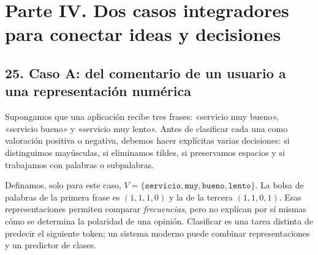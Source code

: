\chapter*{Parte IV. Dos casos integradores para conectar ideas y decisiones}
\section*{25. Caso A: del comentario de un usuario a una representación numérica}
Supongamos que una aplicación recibe tres frases: «servicio muy bueno», «servicio bueno» y «servicio muy lento». Antes de clasificar cada una como valoración positiva o negativa, debemos hacer explícitas varias decisiones: si distinguimos mayúsculas, si eliminamos tildes, si preservamos espacios y si trabajamos con palabras o subpalabras.

\begin{center}
\end{center}
Definamos, solo para este caso, $V=\{\texttt{servicio},\texttt{muy},\texttt{bueno},\texttt{lento}\}$. La bolsa de palabras de la primera frase es $(1,1,1,0)$ y la de la tercera $(1,1,0,1)$. Esas representaciones permiten comparar \emph{frecuencias}, pero no explican por sí mismas cómo se determina la polaridad de una opinión. Clasificar es una tarea distinta de predecir el siguiente token; un sistema moderno puede combinar representaciones y un predictor de clases.

